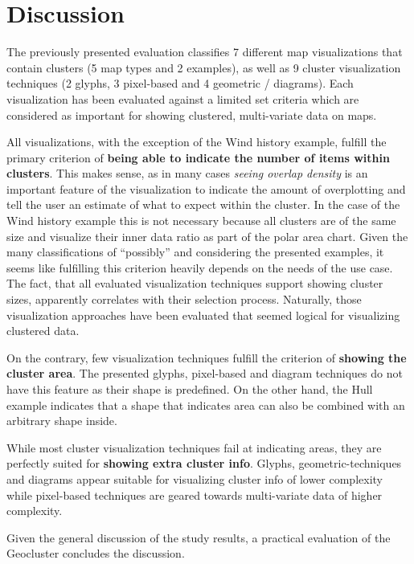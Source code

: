 

\chapter{Discussion}
\label{chapter:discussion}

The previously presented evaluation classifies 7 different map visualizations that contain clusters (5 map types and 2 examples), as well as 9 cluster visualization techniques (2 glyphs, 3 pixel-based and 4 geometric / diagrams). Each visualization has been evaluated against a limited set criteria which are considered as important for showing clustered, multi-variate data on maps.

All visualizations, with the exception of the Wind history example, fulfill the primary criterion of \textbf{being able to indicate the number of items within clusters}. This makes sense, as in many cases \textit{seeing overlap density} is an important feature of the visualization to indicate the amount of overplotting and tell the user an estimate of what to expect within the cluster. In the case of the Wind history example this is not necessary because all clusters are of the same size and visualize their inner data ratio as part of the polar area chart. Given the many classifications of ``possibly'' and considering the presented examples, it seems like fulfilling this criterion heavily depends on the needs of the use case. The fact, that all evaluated visualization techniques support showing cluster sizes, apparently correlates with their selection process. Naturally, those visualization approaches have been evaluated that seemed logical for visualizing clustered data. 

On the contrary, few visualization techniques fulfill the criterion of \textbf{showing the cluster area}. The presented glyphs, pixel-based and diagram techniques do not have this feature as their shape is predefined. On the other hand, the Hull example indicates that a shape that indicates area can also be combined with an arbitrary shape inside.

While most cluster visualization techniques fail at indicating areas, they are perfectly suited for \textbf{showing extra cluster info}. Glyphs, geometric-techniques and diagrams appear suitable for visualizing cluster info of lower complexity while pixel-based techniques are geared towards multi-variate data of higher complexity.


Given the general discussion of the study results, a practical evaluation of the Geocluster concludes the discussion.

